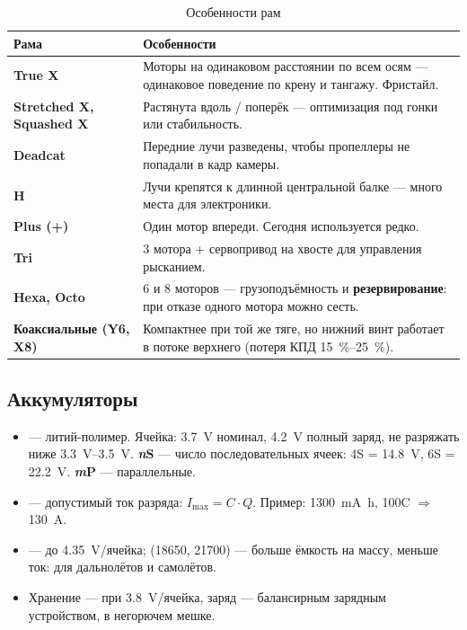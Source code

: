 \begin{table}[H]\centering\small
\renewcommand{\arraystretch}{1.25}
\begin{tabularx}{\linewidth}{@{}p{38mm} X@{}}
\toprule
\textbf{Рама} & \textbf{Особенности} \\
\midrule
\textbf{True X} & Моторы на одинаковом расстоянии по всем осям — одинаковое поведение по крену и тангажу. Фристайл. \\
\textbf{Stretched X, Squashed X} & Растянута вдоль / поперёк — оптимизация под гонки или стабильность. \\
\textbf{Deadcat} & Передние лучи разведены, чтобы пропеллеры не попадали в кадр камеры. \\
\textbf{H} & Лучи крепятся к длинной центральной балке — много места для электроники. \\
\textbf{Plus (+)} & Один мотор впереди. Сегодня используется редко. \\
\textbf{Tri} & 3 мотора + сервопривод на хвосте для управления рысканием. \\
\textbf{Hexa, Octo} & 6 и 8 моторов — грузоподъёмность и \textbf{резервирование}: при отказе одного мотора можно сесть. \\
\textbf{Коаксиальные (Y6, X8)} & Компактнее при той же тяге, но нижний винт работает в потоке верхнего (потеря КПД \SIrange{15}{25}{\percent}). \\
\bottomrule
\end{tabularx}
\caption{Особенности рам}
\end{table}

\subsection{Аккумуляторы}
\begin{itemize}
\item {} — литий-полимер. Ячейка: \SI{3.7}{\volt} номинал, \SI{4.2}{\volt} полный заряд, не разряжать ниже \SIrange{3.3}{3.5}{\volt}. \textbf{\emph{n}S} — число последовательных ячеек: 4S = \SI{14.8}{\volt}, 6S = \SI{22.2}{\volt}. \textbf{\emph{m}P} — параллельные.
\item {} — допустимый ток разряда: $I_\text{max} = C \cdot Q$. Пример: \SI{1300}{\milli\ampere\hour}, 100C $\Rightarrow$ \SI{130}{\ampere}.
\item {} — до \SI{4.35}{\volt}/ячейка;  (18650, 21700) — больше ёмкость на массу, меньше ток: для дальнолётов и самолётов.
\item Хранение — при \SI{3.8}{\volt}/ячейка, заряд — балансирным зарядным устройством, в негорючем мешке.
\end{itemize}


